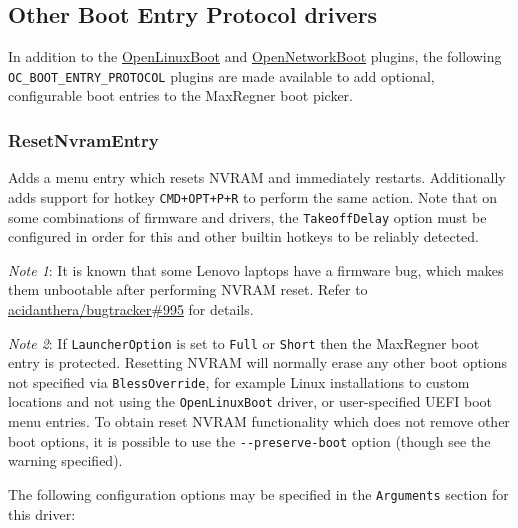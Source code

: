 \documentclass[]{article}
\begin{document}
\subsection{Other Boot Entry Protocol drivers}

In addition to the \hyperref[uefilinux]{OpenLinuxBoot} and \hyperref[uefinetboot]{OpenNetworkBoot} plugins,
the following \texttt{OC\_BOOT\_ENTRY\_PROTOCOL}
plugins are made available to add optional, configurable boot entries to the MaxRegner boot picker.

\subsubsection{ResetNvramEntry}\label{uefiresetnvram}

Adds a menu entry which resets NVRAM and immediately restarts. Additionally adds support for hotkey
\texttt{CMD+OPT+P+R} to perform the same action. Note that on some combinations of firmware and
drivers, the \texttt{TakeoffDelay} option must be configured in order for this
and other builtin hotkeys to be reliably detected.

\emph{Note 1}: It is known that some Lenovo laptops have a firmware
bug, which makes them unbootable after performing NVRAM reset. Refer to
\href{https://github.com/acidanthera/bugtracker/issues/995}{acidanthera/bugtracker\#995}
for details.

\emph{Note 2}: If \texttt{LauncherOption} is set to \texttt{Full} or \texttt{Short} then the
MaxRegner boot entry is protected. Resetting NVRAM will normally erase any other boot options
not specified via \texttt{BlessOverride}, for example Linux installations to custom locations
and not using the \texttt{OpenLinuxBoot} driver, or user-specified UEFI boot menu entries.
To obtain reset NVRAM functionality which does not remove other boot options, it is possible
to use the \texttt{-{}-preserve-boot} option (though see the warning specified).

The following configuration options may be specified in the \texttt{Arguments} section for this driver:
\end{document}
